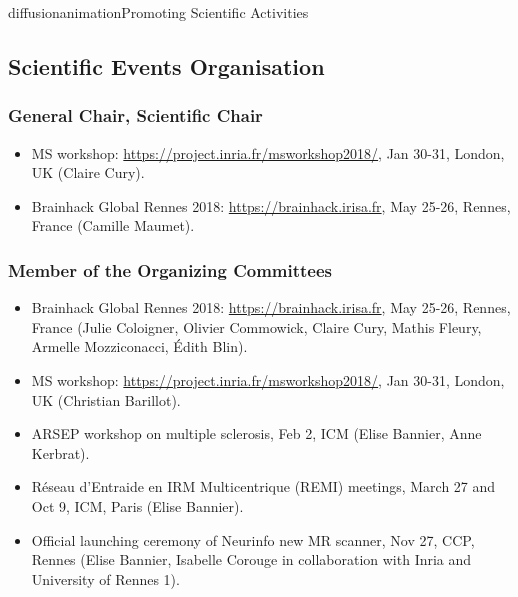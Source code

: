 \documentclass{ra2018}
\begin{document}
\begin{module}{diffusion}{animation}{Promoting Scientific Activities}



\subsection{Scientific Events Organisation}
    \subsubsection{General Chair, Scientific Chair}
    \begin{itemize}
        \item MS workshop: \url{https://project.inria.fr/msworkshop2018/}, Jan 30-31, London, UK (Claire Cury).
        \item Brainhack Global Rennes 2018: \url{https://brainhack.irisa.fr}, May 25-26, Rennes, France (Camille Maumet).
    \end{itemize}    
    

    \subsubsection{Member of the Organizing Committees}
    \begin{itemize}
        \item Brainhack Global Rennes 2018: \url{https://brainhack.irisa.fr}, May 25-26, Rennes, France (Julie Coloigner, Olivier Commowick, Claire Cury, Mathis Fleury, Armelle Mozziconacci, Édith Blin).
	    \item MS workshop: \url{https://project.inria.fr/msworkshop2018/}, Jan 30-31, London, UK (Christian Barillot).
        \item ARSEP workshop on multiple sclerosis, Feb 2, ICM (Elise Bannier, Anne Kerbrat).
        \item Réseau d'Entraide en IRM Multicentrique (REMI) meetings, March 27 and Oct 9, ICM, Paris (Elise Bannier).
        \item Official launching ceremony of Neurinfo new MR scanner, Nov 27, CCP, Rennes (Elise Bannier, Isabelle Corouge in collaboration with Inria and University of Rennes 1).
    \end{itemize}    

\end{module}
\end{document}
